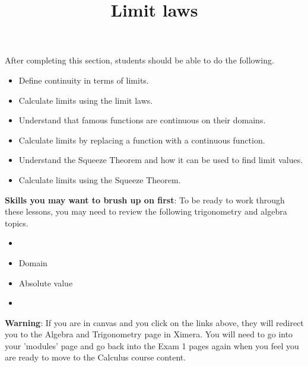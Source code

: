 \documentclass{ximera}
\title{Limit laws}
\begin{document}
\begin{abstract}
\end{abstract}

\maketitle

\begin{sectionOutcomes}
After completing this section, students should be able to do the following.

\begin{itemize}
\item Define continuity in terms of limits.
\item Calculate limits using the limit laws.
\item Understand that famous functions are continuous on their domains. 
\item Calculate limits by replacing a function with a continuous
  function.
\item Understand the Squeeze Theorem and how it can be used to find limit values.
\item Calculate limits using the Squeeze Theorem.
\end{itemize}
\end{sectionOutcomes}

\textbf{Skills you may want to brush up on first}: To be ready to work
through these lessons, you may need to review the following trigonometry and algebra topics.
\begin{itemize}
    \item {}%
    \item Domain
    \item Absolute value
    \item {}
\end{itemize}

\bigskip

\textbf{Warning}: If you are in canvas and you click on the links above, they will redirect you
to the Algebra and Trigonometry page in Ximera. You will need to
go into your 'modules' page and go back into the Exam 1 pages again
when you feel you are ready to move to the Calculus course content.
\end{document}
